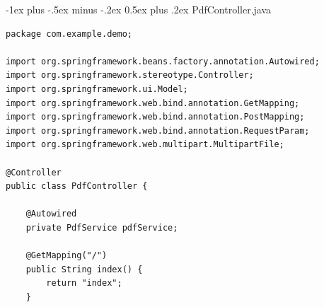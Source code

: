 \documentclass[10pt, landscape]{article}
\makeatletter
\renewcommand{\section}{\@startsection{section}{1}{0mm}%
  {-1ex plus -.5ex minus -.2ex}%
  {0.5ex plus .2ex}%
{\normalfont\large\bfseries}}
\makeatother
\begin{document}
\begin{multicols*}{2}
    \section{PdfController.java}
    \begin{verbatim}
package com.example.demo;

import org.springframework.beans.factory.annotation.Autowired;
import org.springframework.stereotype.Controller;
import org.springframework.ui.Model;
import org.springframework.web.bind.annotation.GetMapping;
import org.springframework.web.bind.annotation.PostMapping;
import org.springframework.web.bind.annotation.RequestParam;
import org.springframework.web.multipart.MultipartFile;

@Controller
public class PdfController {

    @Autowired
    private PdfService pdfService;

    @GetMapping("/")
    public String index() {
        return "index";
    }


\end{verbatim}
\end{multicols*}
\end{document}
